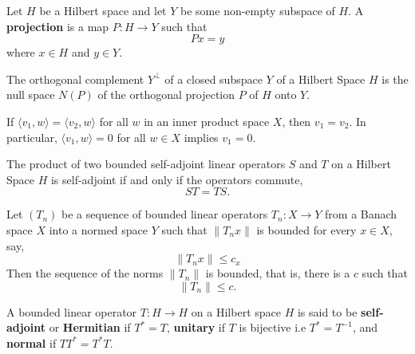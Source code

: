 \begin{definition}
   Let \( H  \) be a Hilbert space and let \( Y  \) be some non-empty subspace of \( H  \). A \textbf{projection} is a map \( P : H \to Y  \) such that 
   \[ Px = y  \]
   where \( x \in H  \) and \( y \in Y  \).
\end{definition}

\begin{lemma}\label{3.3-5}
    The orthogonal complement \( Y^{\perp} \) of a closed subspace \( Y  \) of a Hilbert Space \( H \) is the null space \( N(P) \) of the orthogonal projection \( P  \) of \( H  \) onto \( Y \).
\end{lemma}

\begin{lemma}\label{3.8-2}
   If \( \langle {v}_{1} , w  \rangle = \langle {v}_{2} , w  \rangle  \) for all \( w  \) in an inner product space \( X  \), then \( {v}_{1} = {v}_{2} \). In particular, \( \langle {v}_{1} , w  \rangle = 0  \) for all \( w \in X  \) implies \( {v}_{1} = 0  \). 
\end{lemma}

\begin{theorem}\label{3.10-4}
    The product of two bounded self-adjoint linear operators \( S  \) and \( T  \) on a Hilbert Space \( H \) is self-adjoint if and only if the operators commute, 
    \[  ST = TS. \]
\end{theorem}

\begin{theorem}\label{4.7-3}
    Let \( ({T}_{n}) \) be a sequence of bounded linear operators \( {T}_{n}: X \to Y  \) from a Banach space \( X  \) into a normed space \( Y  \) such that \( \|{T}_{n} x \| \) is bounded for every \( x \in X  \), say,  
    \[  \|{T}_{n} x \| \leq {c}_{x}  \tag{\( n \in \N \)}\]
    Then the sequence of the norms \( \|{T}_{n}\| \) is bounded, that is, there is a \( c  \) such that 
    \[  \|{T}_{n}\| \leq c  \tag{\( n \in \N \)}.\]
\end{theorem}

\begin{definition}
   A bounded linear operator \( T: H \to H  \) on a Hilbert space \( H  \) is said to be \textbf{self-adjoint} or \textbf{Hermitian} if \( T^{*} = T  \), \textbf{unitary} if \( T  \) is bijective i.e \( T^{*} = T^{-1} \), and \textbf{normal} if \( T T^{*} = T^{*} T  \).
\end{definition}


